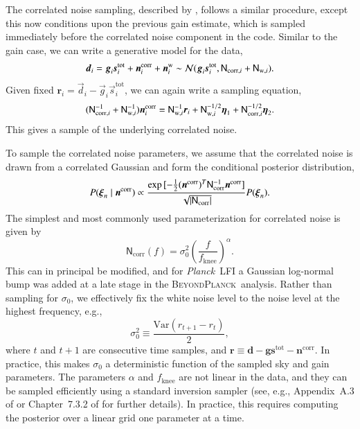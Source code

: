 \documentclass[twocolumn]{../../common/aa}
\def\Planck{\emph{Planck}}
\newcommand{\dv}[0]{\vec{d}}
\newcommand{\n}[0]{\vec{n}}
\newcommand{\s}[0]{\vec{s}}
\newcommand{\g}[0]{\vec{g}}
\newcommand{\N}[0]{\tens{N}}
\newcommand{\bp}{\textsc{BeyondPlanck}}
\begin{document}
The correlated noise sampling, described by \citet{bp06}, follows a similar procedure, except this now conditions upon the previous gain estimate, which is sampled immediately before the correlated noise component in the code. Similar to the gain case, we can write a generative model for the data,
\begin{equation}
	\dv_i=\g_i\s_i^\mathrm{tot}+\n_i^\mathrm{corr}+\n^\mathrm{w}_i
	\sim\mathcal N(\g_i\s_i^\mathrm{tot},\N_{\mathrm{corr},i}+\N_{\mathrm{w},i}).
\end{equation}
Given fixed $\boldsymbol r_i=\dv_i-\g_i\s_i^\mathrm{tot}$, we can again write a sampling equation, 
\begin{equation}
	\label{eq:ncorr_gauss_samp}
	(\N_{\mathrm{corr},i}^{-1}+\N_{\mathrm{w},i}^{-1})
	\n^\mathrm{corr}_i
	=\N^{-1}_{\mathrm{w},i}\boldsymbol r_i
	+\N^{-1/2}_{\mathrm{w},i}\boldsymbol\eta_1
	+\N^{-1/2}_{\mathrm{corr},i}\boldsymbol\eta_2.
\end{equation}
This gives a sample of the underlying correlated noise. %

To sample the correlated noise parameters, we assume that the correlated noise is drawn from a correlated Gaussian and form the conditional posterior distribution,
\begin{equation}
	P(\boldsymbol\xi_n\mid\n^\mathrm{corr})\propto\frac{\exp{[-\frac12(\n^\mathrm{corr})^T\N_\mathrm{corr}^{-1}\n^\mathrm{corr}]}}
	{\sqrt{|\N_\mathrm{corr}|}}P(\boldsymbol\xi_n).
\end{equation}
The simplest and most commonly used parameterization for correlated noise is given by
\begin{equation}
	\mathsf N_\mathrm{corr}(f)=\sigma_0^2\left(\frac f{f_\mathrm{knee}}\right)^\alpha.
\end{equation}
This can in principal be modified, and for \Planck\ LFI a Gaussian log-normal bump was added at a late stage in the \bp\ analysis. Rather than sampling for $\sigma_0$, we effectively fix the white noise level to the noise level at the highest frequency, e.g.,
\begin{equation}
	\sigma_0^2\equiv\frac{\mathrm{Var}(r_{t+1}-r_t)}2,
\end{equation}
where $t$ and $t+1$ are consecutive time samples, and ${\boldsymbol r\equiv\boldsymbol d-\boldsymbol g\boldsymbol s^\mathrm{tot}
-\boldsymbol n^\mathrm{corr}}$. In practice, this makes $\sigma_0$ a deterministic function of the sampled sky and gain parameters. The parameters $\alpha$ and $f_\mathrm{knee}$ are not linear in the data, and they can be sampled efficiently using a standard inversion sampler (see, e.g., Appendix~A.3 of \citealt{bp01} or Chapter~7.3.2 of \citealt{numerical_recipes} for further details). In practice, this requires computing the posterior over a linear grid one parameter at a time.
\end{document}
